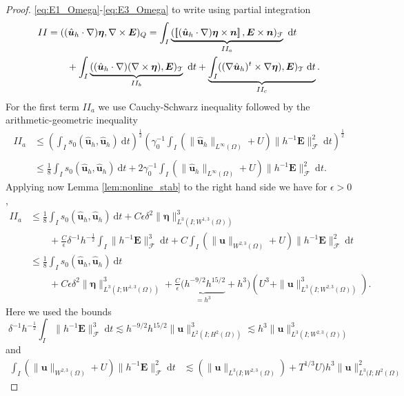\documentclass[10pt]{amsart}
\numberwithin{equation}{section}
\theoremstyle{definition}
\theoremstyle{remark}
\renewcommand{\(}{\bigl(}
\renewcommand{\)}{\bigr)}
\newcommand{\jump}[1]{\left[\hspace{-0.025in}\left[#1\right]\hspace{-0.025in}\right]}
\newcommand{\bld}[1]{\boldsymbol{#1}}
\newcommand{\bn}{\bld{n}}
\newcommand{\bu}{\bld{u}}
\newcommand{\bhu}{\hat{\bld{u}}}
\newcommand{\bE}{\bld{E}}
\newcommand{\bldeta}{\bld{\eta}}
\begin{document}
\begin{proof}
\eqref{eq:E1_Omega}-\eqref{eq:E3_Omega} to write using partial integration
\begin{align*}
II &= ((\bhu_h \cdot \nabla) \bldeta,\nabla \times \bE)_Q = 
\int_I \underbrace{
(\jump{(\bhu_h \cdot \nabla) \bldeta \times \bn}, \bE \times
\bn)_{\mathcal{F}}}_{II_a}~\mbox{d}t  
\\
&\qquad + \int_I \underbrace{((\bhu_h \cdot \nabla) (\nabla \times \bldeta) ,
\bE)_{\mathcal{T}} }_{II_b} ~\mbox{d}t +\underbrace{\int_I ((\nabla \bhu_h)^t\times \nabla \bldeta) ,
\bE)_{\mathcal{T}} ~\mbox{d}t }_{II_c}.
\end{align*}
For the first term $II_a$ we use Cauchy-Schwarz inequality followed by the
arithmetic-geometric inequality
\begin{align*}
II_a &\leq \left(\int_I s_0(\bhu_h,\bhu_h) ~\mbox{d}t \right)^{\frac12}
\left(\gamma_0^{-1}\int_I
(\|\bhu_h\|_{L^{\infty}(\Omega)} + U)\|h^{-1} \bE
\|_{\mathcal{F}}^2 ~\mbox{d}t \right)^{\frac12} \\
\\
&\leq
\frac18\int_I s_0(\bhu_h,\bhu_h) ~\mbox{d}t + 2 \gamma_0^{-1}\int_I
(\|\bhu_h\|_{L^{\infty}(\Omega)}+U) \|h^{-1} \bE
\|_{\mathcal{F}}^2 ~\mbox{d}t .
\end{align*}
Applying now Lemma \ref{lem:nonline_stab} to the right hand side we
have for $\epsilon>0$,
\begin{align*}
II_a & \leq \frac18 \int_I s_0(\bhu_h,\bhu_h) ~\mbox{d}t +C\epsilon
\delta^2 \|\bldeta\|^3_{L^3(I;W^{1,3}(\Omega))} 
\\
&\qquad 
+ \frac{C}{\epsilon} 
\delta^{-1} h^{-\frac{1}{2}}\int_I   \|h^{-1} \bE
\|_{\mathcal{F}}^3 ~\mbox{d}t
 +C \int_I ( \|\bu\|_{W^{2,3}(\Omega)}+U)\|h^{-1} \bE
\|_{\mathcal{F}}^2 ~\mbox{d}t 
\\
&\leq \frac18 \int_I s_0(\bhu_h,\bhu_h) ~\mbox{d}t 
\\
&\qquad 
+C\epsilon \delta^2 \|\bldeta\|^3_{L^3(I;W^{1,3}(\Omega))} +\frac{C}{\epsilon} \underbrace{ (h^{-9/2}
h^{15/2}}_{ = h^3} + h^3)(U^3 +\|\bu\|^3_{L^3(I;W^{2,3}(\Omega))}).
\end{align*}
Here we used the bounds
\[
\delta^{-1} h^{-\frac{1}{2}}\int_I   \|h^{-1} \bE
\|_{\mathcal{F}}^3 ~\mbox{d}t \lesssim h^{-9/2}
h^{15/2} \|\bu\|^3_{L^2(I;H^{2}(\Omega))} \lesssim h^3 \|\bu\|^3_{L^3(I;W^{2,3}(\Omega))}
\]
and
\begin{align*}
\int_I ( \|\bu\|_{W^{2,3}(\Omega)}+U)\|h^{-1} \bE
\|_{\mathcal{F}}^2 ~\mbox{d}t  &\lesssim
(\|\bu\|_{L^3(I;W^{2,3}(\Omega)}) + T^{1/3} U) h^3
\|\bu\|^2_{L^{3}(I;H^2(\Omega)} 

\end{align*}
\end{proof}
\end{document}
